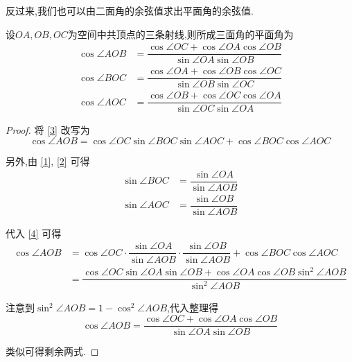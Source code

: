 \documentclass{article}
\begin{document}
反过来,我们也可以由二面角的余弦值求出平面角的余弦值.

\begin{thm}[三面角第二余弦定理]
    设$OA, OB, OC$为空间中共顶点的三条射线,则所成三面角的平面角为
    \begin{align*}
        \cos \angle AOB & = \dfrac{\cos \angle OC + \cos \angle OA \cos \angle OB}{\sin \angle OA \sin \angle OB} \\
        \cos \angle BOC & = \dfrac{\cos \angle OA + \cos \angle OB \cos \angle OC}{\sin \angle OB \sin \angle OC} \\
        \cos \angle AOC & = \dfrac{\cos \angle OB + \cos \angle OC \cos \angle OA}{\sin \angle OC \sin \angle OA}
    \end{align*}
\end{thm}

\begin{proof}
    将 \eqref{3} 改写为
    \begin{equation}
        \cos \angle AOB  = \cos \angle OC \sin \angle BOC \sin \angle AOC + \cos \angle BOC \cos \angle AOC \label{4}
    \end{equation}

    另外,由 \eqref{1}, \eqref{2} 可得
    \begin{align*}
        \sin \angle BOC & = \dfrac{\sin \angle OA}{\sin \angle AOB} \\
        \sin \angle AOC & = \dfrac{\sin \angle OB}{\sin \angle AOB}
    \end{align*}

    代入 \eqref{4} 可得
    \begin{align*}
        \cos \angle AOB & = \cos \angle OC \cdot \dfrac{\sin \angle OA}{\sin \angle AOB} \cdot
            \dfrac{\sin \angle OB}{\sin \angle AOB} + \cos \angle BOC \cos \angle AOC \\
        & = \dfrac{\cos \angle OC \sin \angle OA \sin \angle OB + \cos \angle OA \cos \angle OB \sin^2 \angle AOB}
            {\sin^2 \angle AOB}
    \end{align*}

    注意到$\sin^2 \angle AOB = 1 - \cos^2 \angle AOB$,代入整理得
    \[ \cos \angle AOB = \dfrac{\cos \angle OC + \cos \angle OA \cos \angle OB}{\sin \angle OA \sin \angle OB} \]

    类似可得剩余两式.
\end{proof}
\end{document}
